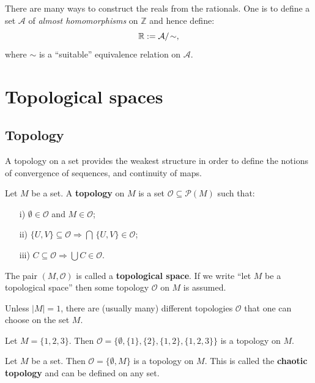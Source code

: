 \documentclass[root.tex]{subfiles}
\begin{document}
There are many ways to construct the reals from the rationals. One is to define a set $\mathcal{A}$ of \emph{almost homomorphisms} on $\mathbb{Z}$ and hence define:
$$
\mathbb{R}\index{$\mathbb{R}$} := \mathcal{A}/\!\sim,
$$
where $\sim$ is a ``suitable'' equivalence relation on $\mathcal{A}$.



\chapter{Topological spaces}%

\section{Topology}

A topology on a set provides the weakest structure in order to define the notions of convergence of sequences, and continuity of maps. 

\begin{mydef}
  Let $M$ be a set. A \textbf{topology} on $M$ is a set $\mathcal{O} \subseteq \mathcal{P}(M)$ such that:
\begin{enumerate}
\item[i)] $\emptyset \in \mathcal{O}$ and $M \in \mathcal{O}$;
\item[ii)] $\{U,V\}\subseteq \mathcal{O} \Rightarrow \bigcap\, \{U,V\} \in \mathcal{O}$;
\item[iii)] $C \subseteq \mathcal{O} \Rightarrow \bigcup C \in \mathcal{O}$.
\end{enumerate}

The pair $(M,\mathcal{O})$ is called a \textbf{topological space}. If we write ``let $M$ be a topological space'' then some topology $\mathcal{O}$ on $M$ is assumed.
\end{mydef}


\begin{remark}
Unless $|M|=1$, there are (usually many) different topologies $\mathcal{O}$ that one can choose on the set $M$.
\end{remark}

\begin{myex}
Let $M = \{1,2,3\}$. Then $\mathcal{O}=\{\emptyset,\{1\},\{2\},\{1,2\},\{1,2,3\}\}$ is a topology on $M$.
\end{myex}

\begin{myex}
Let $M$ be a set. Then $\mathcal{O}=\{\emptyset , M\}$ is a topology on $M$. This is called the \textbf{chaotic topology} and can be defined on any set.
\end{myex}
\end{document}
